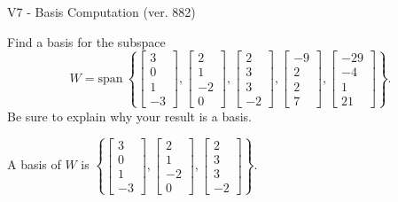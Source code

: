 \begin{exercise}
  \begin{exerciseTitle}V7 - Basis Computation (ver. 882)\end{exerciseTitle}
  \begin{exerciseStatement}
    Find a basis for the subspace 
\[W=\mathrm{span}\ \left\{\left[\begin{array}{r}
3 \\
0 \\
1 \\
-3
\end{array}\right] , \left[\begin{array}{r}
2 \\
1 \\
-2 \\
0
\end{array}\right] , \left[\begin{array}{r}
2 \\
3 \\
3 \\
-2
\end{array}\right] , \left[\begin{array}{r}
-9 \\
2 \\
2 \\
7
\end{array}\right] , \left[\begin{array}{r}
-29 \\
-4 \\
1 \\
21
\end{array}\right]\right\}.\]
 Be sure to explain why your result is a basis.


  \end{exerciseStatement}
  \begin{exerciseAnswer}
   A basis of \(W\) is  \(\left\{\left[\begin{array}{r}
3 \\
0 \\
1 \\
-3
\end{array}\right] , \left[\begin{array}{r}
2 \\
1 \\
-2 \\
0
\end{array}\right] , \left[\begin{array}{r}
2 \\
3 \\
3 \\
-2
\end{array}\right]\right\}\).
  


  \end{exerciseAnswer}
\end{exercise}